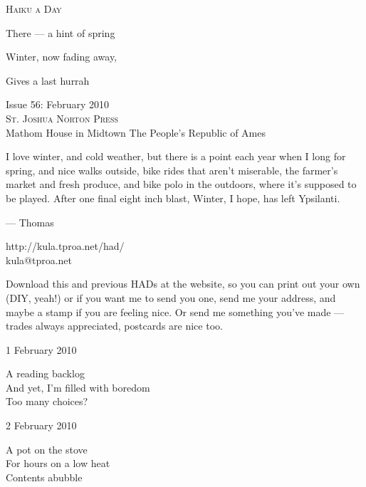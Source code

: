 \documentclass[12pt]{article}
\begin{document}
\begin{center}
{\fontsize{36}{48}\selectfont \textsc{Haiku a Day }}
\end{center}

\vspace*{3.5cm}

{\fontsize{26}{52}\selectfont 

There --- a hint of spring

Winter, now fading away,

Gives a last hurrah

}

\vspace*{5.0cm}
\begin{center}
{\large{Issue 56: February 2010}} \\[5mm]
{\fontsize{8}{8}\selectfont  \textsc{ St. Joshua Norton Press }} \\[1mm]
{\fontsize{6}{6}\selectfont Mathom House in Midtown \textbar The People's Republic of Ames }
\end{center}


\newpage

I love winter, and cold weather, but there is a point each year when
I long for spring, and nice walks outside, bike rides that aren't
miserable, the farmer's market and fresh produce, and bike polo in 
the outdoors, where it's supposed to be played. After one final
eight inch blast, Winter, I hope, has left Ypsilanti.

--- Thomas

http://kula.tproa.net/had/ \\
kula@tproa.net

Download this and previous HADs at the website, so you can
print out your own (DIY, yeah!) or if you want me to send
you one, send me your address, and maybe a stamp if you
are feeling nice. Or send me something you've made ---
trades always appreciated, postcards are nice too.

\vspace*{2cm}

\newpage

1 February 2010

A reading backlog \\
And yet, I'm filled with boredom \\
Too many choices?

2 February 2010

A pot on the stove \\
For hours on a low heat \\
Contents abubble
\end{document}
